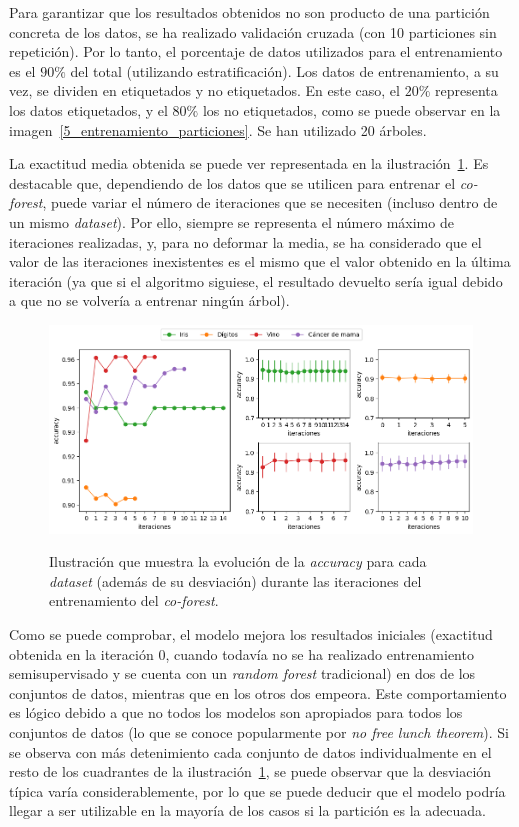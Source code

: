 \begin{itemize}
	Para garantizar que los resultados obtenidos no son producto de una partición concreta de los datos, se ha realizado validación cruzada (con 10 particiones sin repetición). Por lo tanto, el porcentaje de datos utilizados para el entrenamiento es el $90\%$ del total (utilizando estratificación). Los datos de entrenamiento, a su vez, se dividen en etiquetados y no etiquetados. En este caso, el $20\%$ representa los datos etiquetados, y el $80\%$ los no etiquetados, como se puede observar en la imagen~\ref{5_entrenamiento_particiones}. Se han utilizado 20 árboles.
	
	La exactitud media obtenida se puede ver representada en la ilustración~\ref{gr:cf_train-iterations}. Es destacable que, dependiendo de los datos que se utilicen para entrenar el \textit{co-forest}, puede variar el número de iteraciones que se necesiten (incluso dentro de un mismo \textit{dataset}). Por ello, siempre se representa el número máximo de iteraciones realizadas, y, para no deformar la media, se ha considerado que el valor de las iteraciones inexistentes es el mismo que el valor obtenido en la última iteración (ya que si el algoritmo siguiese, el resultado devuelto sería igual debido a que no se volvería a entrenar ningún árbol).
	
	\begin{figure}[h]
		\caption[\textit{Co-Forest}: resultados (iteraciones-entrenamiento)]{Ilustración que muestra la evolución de la \textit{accuracy} para cada \textit{dataset} (además de su desviación) durante las iteraciones del entrenamiento del \textit{co-forest}.}
		\centering
		\includegraphics[scale=0.55]{../img/memoria/5_coforest_score-iteraciones}
		\label{gr:cf_train-iterations}
	\end{figure}

	Como se puede comprobar, el modelo mejora los resultados iniciales (exactitud obtenida en la iteración $0$, cuando todavía no se ha realizado entrenamiento semisupervisado y se cuenta con un \textit{random forest} tradicional) en dos de los conjuntos de datos, mientras que en los otros dos empeora. Este comportamiento es lógico debido a que no todos los modelos son apropiados para todos los conjuntos de datos (lo que se conoce popularmente por \textit{no free lunch theorem}). Si se observa con más detenimiento cada conjunto de datos individualmente en el resto de los cuadrantes de la ilustración~\ref{gr:cf_train-iterations}, se puede observar que la desviación típica varía considerablemente, por lo que se puede deducir que el modelo podría llegar a ser utilizable en la mayoría de los casos si la partición es la adecuada.


\end{itemize}
